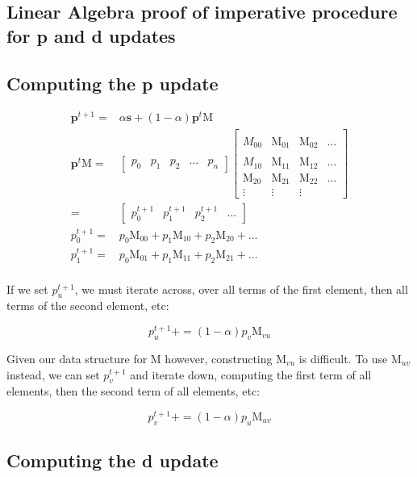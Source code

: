 \documentclass[12pt]{article}
\newcommand{\vek}[1]{\textbf{#1}}
\newcommand{\M}{\textrm{M}}
\begin{document}
\clearpage
\begin{appendix}
\section{Linear Algebra proof of imperative procedure for p and d updates}

\subsection{Computing the p update}
\begin{align*}
\vek{p}^{t+1} =& \alpha \vek{s} + (1-\alpha)\vek{p}^t \M\\
\vek{p}^t \M =& \left[ \begin{array}{ccccc} 
p_0 & p_1 & p_2 & \ldots & p_n 
\end{array} \right] \left[ \begin{array}{cccc}
\\M_{00} & \M_{01} & \M_{02} & \ldots \\
\\M_{10} & \M_{11} & \M_{12} & \ldots \\
\M_{20} & \M_{21} & \M_{22} & \ldots \\
\vdots & \vdots & \vdots
\end{array} \right]\\
=& \left[ \begin{array}{cccc} p^{t+1}_0 & p^{t+1}_1 & p^{t+1}_2 & \ldots \end{array} \right]\\
p^{t+1}_0 =& p_0 \M_{00} + p_1 \M_{10} + p_2 \M_{20} + \ldots\\
p^{t+1}_1 =& p_0 \M_{01} + p_1 \M_{11} + p_2 \M_{21} + \ldots\\
\end{align*}

If we set $p^{t+1}_u$, we must iterate across, over all terms of the first element, then all terms of the second element, etc:

$$p^{t+1}_u += (1-\alpha) p_v \M_{vu}$$

Given our data structure for $\M$ however, constructing $\M_{vu}$ is difficult. To use $\M_{uv}$ instead, we can set $p^{t+1}_v$ and iterate down, computing the first term of all elements, then the second term of all elements, etc:

$$p^{t+1}_{v} += (1-\alpha) p_u \M_{uv}$$

\subsection{Computing the d update}


\end{appendix}
\end{document}
